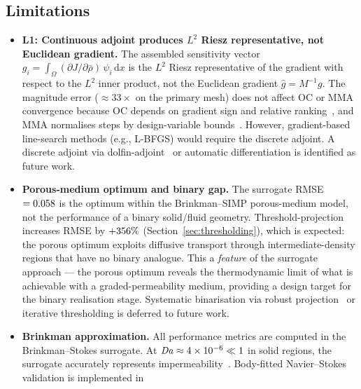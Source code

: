 \subsection{Limitations}
\label{sec:limitations}
\label{sec:known_limitations}
\begin{itemize}
    \item \textbf{L1: Continuous adjoint produces $L^2$ Riesz
          representative, not Euclidean gradient.}
          The assembled sensitivity vector
          $g_i = \int_\Omega (\partial J/\partial\bar\rho)\,
          \psi_i\,\mathrm{d}x$ is the $L^2$ Riesz representative
          of the gradient with respect to the $L^2$ inner product,
          not the Euclidean gradient $\hat{g} = M^{-1}g$.
          The magnitude error ($\approx 33\times$ on the primary mesh)
          does not affect OC or MMA convergence because OC depends
          on gradient sign and relative ranking~\cite{bendsoe2003},
          and MMA normalises steps by design-variable
          bounds~\cite{svanberg1987}.
          However, gradient-based line-search methods (e.g., L-BFGS)
          would require the discrete adjoint.
          A discrete adjoint via dolfin-adjoint~\cite{farrell2013}
          or automatic differentiation is identified as future work.
    \item \textbf{Porous-medium optimum and binary gap.}
          The surrogate RMSE~$=0.058$ is the optimum
          within the Brinkman--SIMP porous-medium model, not the
          performance of a binary solid/fluid geometry.
          Threshold-projection increases RMSE by $+356\%$
          (Section~\ref{sec:thresholding}), which is expected:
          the porous optimum exploits diffusive transport through
          intermediate-density regions that have no binary analogue.
          This a \emph{feature} of the surrogate approach ---
          the porous optimum reveals the thermodynamic limit of
          what is achievable with a graded-permeability medium,
          providing a design target for the binary realisation stage.
          Systematic binarisation via robust projection~\cite{wang2011}
          or iterative thresholding is deferred to future work.
    \item \textbf{Brinkman approximation.}
          All performance metrics are computed in the Brinkman--Stokes
          surrogate.
          At $\mathit{Da} \approx 4\times10^{-6} \ll 1$ in solid regions, the
          surrogate accurately represents impermeability~\cite{borrvall2003}.
          Body-fitted Navier--Stokes validation is implemented in

\end{itemize}
